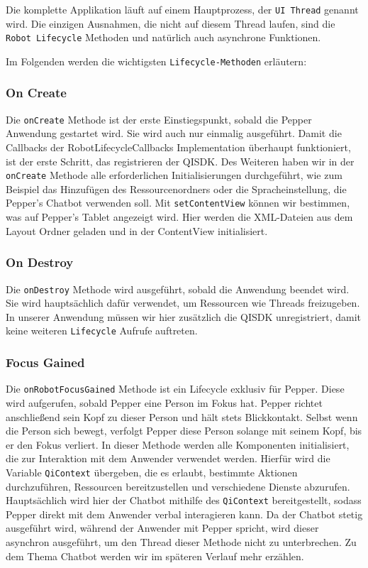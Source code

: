 Die komplette Applikation läuft auf einem Hauptprozess, der \verb|UI Thread| genannt wird. Die einzigen Ausnahmen, die nicht auf diesem 
Thread laufen, sind die \verb|Robot Lifecycle| Methoden und natürlich auch asynchrone Funktionen.

Im Folgenden werden die wichtigsten \verb|Lifecycle-Methoden| erläutern:\\

\subsubsection{On Create} 

Die \verb|onCreate| Methode ist der erste Einstiegspunkt, sobald die Pepper Anwendung gestartet wird. Sie wird auch nur einmalig 
ausgeführt. Damit die Callbacks der RobotLifecycleCallbacks Implementation überhaupt funktioniert, ist der erste Schritt, das registrieren 
der QISDK. Des Weiteren haben wir in der \verb|onCreate| Methode alle erforderlichen Initialisierungen durchgeführt, wie zum Beispiel 
das Hinzufügen des Ressourcenordners oder die Spracheinstellung, die Pepper's Chatbot verwenden soll.
Mit \verb|setContentView| können wir bestimmen, was auf Pepper’s Tablet angezeigt wird. Hier werden die XML-Dateien aus dem Layout 
Ordner geladen und in der ContentView initialisiert. \\

\subsubsection{On Destroy} 

Die \verb|onDestroy| Methode wird ausgeführt, sobald die Anwendung beendet wird. Sie wird hauptsächlich dafür verwendet, um Ressourcen 
wie Threads freizugeben. In unserer Anwendung müssen wir hier zusätzlich die QISDK unregistriert, damit keine weiteren \verb|Lifecycle| 
Aufrufe auftreten. \\

\subsubsection{Focus Gained} 

Die \verb|onRobotFocusGained| Methode ist ein Lifecycle exklusiv für Pepper. Diese wird aufgerufen, sobald Pepper eine Person im Fokus 
hat. Pepper richtet anschließend sein Kopf zu dieser Person und hält stets Blickkontakt. Selbst wenn die Person sich bewegt, verfolgt Pepper 
diese Person solange mit seinem Kopf, bis er den Fokus verliert. 
In dieser Methode werden alle Komponenten initialisiert, die zur Interaktion mit dem Anwender verwendet werden. Hierfür wird die Variable 
\verb|QiContext| übergeben, die es erlaubt, bestimmte Aktionen durchzuführen, Ressourcen bereitzustellen und verschiedene Dienste 
abzurufen. 
Hauptsächlich wird hier der Chatbot mithilfe des \verb|QiContext| bereitgestellt, sodass Pepper direkt mit dem Anwender verbal interagieren 
kann. Da der Chatbot stetig ausgeführt wird, während der Anwender mit Pepper spricht, wird dieser asynchron ausgeführt, um den Thread 
dieser Methode nicht zu unterbrechen. Zu dem Thema Chatbot werden wir im späteren Verlauf mehr erzählen. \\

